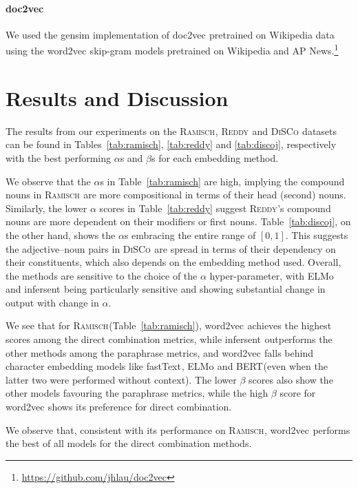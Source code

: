 \documentclass[11pt,a4paper]{article}
\newcommand{\embmethod}[2][]{\textsf{#2}$_{\text{#1}}$\xspace}
\newcommand{\wordtovec}{\embmethod{word2vec}}
\newcommand{\infersent}[1][]{\embmethod[#1]{infersent}}
\newcommand{\doctovec}{\embmethod{doc2vec}}
\newcommand{\elmo}{\embmethod{ELMo}}
\newcommand{\fasttext}{\embmethod{fastText}}
\newcommand{\bert}{\embmethod{BERT}}
\newcommand{\dataset}[2][]{\textsc{#2}$_{\text{#1}}$\xspace}
\newcommand{\reddy}{\dataset{Reddy}}
\newcommand{\ramisch}{\dataset{Ramisch}}
\newcommand{\discoj}[1][]{\dataset[#1]{DiSCo}}
\newcommand{\tabref}[2][]{Table#1~\ref{#2}\xspace}
\begin{document}
\paragraph{\doctovec}
We used the gensim implementation of \doctovec \cite{Le+:2014,Lau:Baldwin:2016b} pretrained on Wikipedia data using the \wordtovec skip-gram models pretrained on Wikipedia and AP News.\footnote{\url{https://github.com/jhlau/doc2vec}}



\section{Results and Discussion}
\label{ssec:accessibility}

The results from our experiments on the \ramisch, \reddy and \discoj datasets can be found in \tabref[s]{tab:ramisch}, \ref{tab:reddy} and \ref{tab:discoj}, respectively with the best performing $\alpha$s and $\beta$s for each embedding method.

We observe that the $\alpha$s in \tabref{tab:ramisch} are high, implying the compound nouns in \ramisch are more compositional in terms of their head (second) nouns. Similarly, the lower $\alpha$ scores in \tabref{tab:reddy} suggest \reddy's compound nouns are more dependent on their modifiers or first nouns. \tabref{tab:discoj}, on the other hand, shows the $\alpha$s embracing the entire range of $[0,1]$. This suggests the adjective--noun pairs in \discoj are spread in terms of their dependency on their constituents, which also depends on the embedding method used. Overall, the methods are sensitive to the choice of the $\alpha$ hyper-parameter, with \elmo and \infersent being particularly sensitive and showing substantial change in output with change in $\alpha$.

We see that for \ramisch (\tabref{tab:ramisch}), \wordtovec achieves the highest scores among the direct combination metrics, while \infersent outperforms the other methods among the paraphrase metrics, and \wordtovec falls behind character embedding models like \fasttext, \elmo and \bert (even when the latter two were performed without context). The lower $\beta$ scores also show the other models favouring the paraphrase metrics, while the high $\beta$ score for \wordtovec shows its preference for direct combination.

We observe that, consistent with its performance on \ramisch, \wordtovec performs the best of all models for the direct combination methods.
\end{document}
